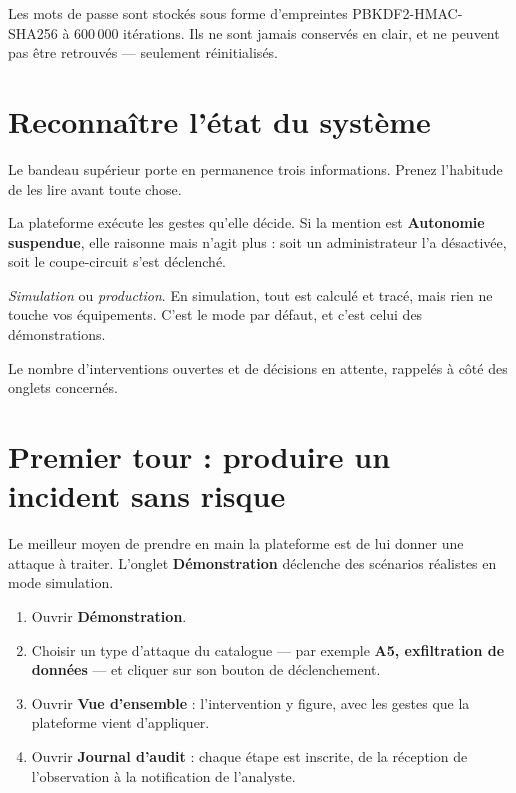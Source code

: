 Les mots de passe sont stockés sous forme d'empreintes PBKDF2-HMAC-SHA256 à
600\,000 itérations. Ils ne sont jamais conservés en clair, et ne peuvent pas
être retrouvés — seulement réinitialisés.

\section{Reconnaître l'état du système}

Le bandeau supérieur porte en permanence trois informations. Prenez l'habitude
de les lire avant toute chose.

\begin{description}[leftmargin=3.8cm, style=nextline]
  \item[Autonomie active] La plateforme exécute les gestes qu'elle décide. Si
        la mention est \textbf{Autonomie suspendue}, elle raisonne mais n'agit
        plus : soit un administrateur l'a désactivée, soit le coupe-circuit
        s'est déclenché.
  \item[Mode d'actionnement] \emph{Simulation} ou \emph{production}. En
        simulation, tout est calculé et tracé, mais rien ne touche vos
        équipements. C'est le mode par défaut, et c'est celui des
        démonstrations.
  \item[Compteurs] Le nombre d'interventions ouvertes et de décisions en
        attente, rappelés à côté des onglets concernés.
\end{description}

\section{Premier tour : produire un incident sans risque}

Le meilleur moyen de prendre en main la plateforme est de lui donner une
attaque à traiter. L'onglet \textbf{Démonstration} déclenche des scénarios
réalistes en mode simulation.

\begin{enumerate}[leftmargin=*]
  \item Ouvrir \textbf{Démonstration}.
  \item Choisir un type d'attaque du catalogue --- par exemple \textbf{A5,
        exfiltration de données} --- et cliquer sur son bouton de déclenchement.
  \item Ouvrir \textbf{Vue d'ensemble} : l'intervention y figure, avec les
        gestes que la plateforme vient d'appliquer.
  \item Ouvrir \textbf{Journal d'audit} : chaque étape est inscrite, de la
        réception de l'observation à la notification de l'analyste.
\end{enumerate}


